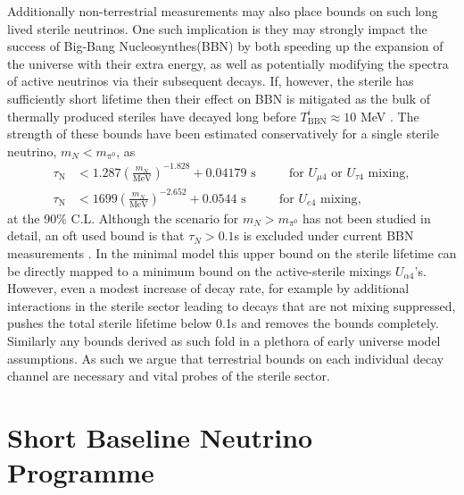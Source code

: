 \documentclass[11pt, a4paper]{article}
\begin{document}
Additionally non-terrestrial measurements may also place bounds on such long lived sterile neutrinos. One such implication is they may strongly impact the success of Big-Bang Nucleosynthes(BBN) by both speeding up the expansion of the universe with their extra energy, as well as potentially modifying the spectra of active neutrinos via their subsequent decays. If, however, the sterile has sufficiently short lifetime  then their effect on BBN is mitigated as the bulk of thermally produced steriles have decayed long before $T^i_\text{BBN} \approx 10$ MeV \cite{Fields:2006ga}. The strength of these bounds have been estimated conservatively for a single sterile neutrino, $m_N < m_{\pi^0}$, as \cite{Dolgov:2000jw,Dolgov:2000pj}
\begin{align*}
	\tau_\text{N} &< 1.287 \left( \frac{m_N}{\text{MeV}}\right)^{-1.828}+0.04179 \text{  s    $\qquad$  for $U_{\mu 4}$ or $U_{\tau 4}$ mixing},\\
	\tau_\text{N} &< 1699 \left( \frac{m_N}{\text{MeV}}\right)^{-2.652}+0.0544 \text{  s    $\qquad$  for $U_{e 4}$ mixing},
\end{align*}
at the 90\% C.L. Although the scenario for $m_N > m_{\pi^0}$ has not been studied in detail, an oft used bound is that $\tau_N > 0.1$s is excluded under current BBN measurements \cite{Dolgov:2000j}. In the minimal model this upper bound on the sterile lifetime can be directly mapped to a minimum bound on the active-sterile mixings $U_{\alpha 4}$'s. However, even a modest increase of decay rate, for example by additional interactions in the sterile sector leading to decays that are not mixing suppressed, pushes the total sterile lifetime below 0.1s and removes the bounds completely. Similarly any bounds derived as such fold in a plethora of early universe model assumptions. As such we argue that terrestrial bounds on each individual decay channel are necessary and vital probes of the sterile sector. \\

\section{\label{sec:simulation}Short Baseline Neutrino Programme}
\end{document}
